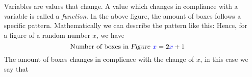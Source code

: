 





\newpage
\section{\fintro}
Variables are values that change. A value which changes in compliance with a variable is called a \textit{function}.\vsk
{}
In the above figure, the amount of boxes follows a specific pattern. Mathematically we can describe the pattern like this:
Hence, for a figure of a random number $ x $, we have
\[ \text{Number of boxes in \textsl{Figure }}{\color{blue}x}=2{\color{blue}x}+1 \]
The amount of boxes changes in complience with the change of $ x $, in this case we say that\regv
\st{}\regv

